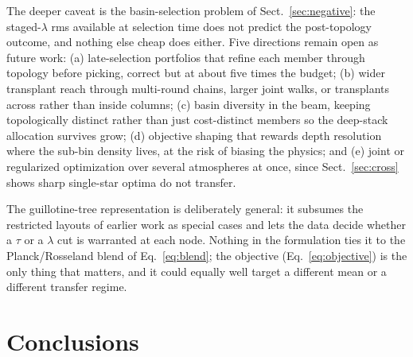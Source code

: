 \documentclass{aa}
\begin{document}
   The deeper caveat is the basin-selection problem of
   Sect.~\ref{sec:negative}: the staged-$\lambda$ rms available at
   selection time does not predict the post-topology outcome, and nothing
   else cheap does either. Five directions remain open as future work:
   (a) late-selection portfolios that refine each member through topology
   before picking, correct but at about five times the budget; (b) wider
   transplant reach through multi-round chains, larger joint walks, or
   transplants across rather than inside columns; (c) basin diversity in
   the beam, keeping topologically distinct rather than just
   cost-distinct members so the deep-stack allocation survives grow;
   (d) objective shaping that rewards depth resolution where the sub-bin
   density lives, at the risk of biasing the physics; and (e) joint or
   regularized optimization over several atmospheres at once, since
   Sect.~\ref{sec:cross} shows sharp single-star optima do not transfer.

   The guillotine-tree representation is deliberately general: it
   subsumes the restricted layouts of earlier work as special cases and
   lets the data decide whether a $\tau$ or a $\lambda$ cut is warranted
   at each node. Nothing in the formulation ties it to the
   Planck/Rosseland blend of Eq.~\ref{eq:blend}; the objective
   (Eq.~\ref{eq:objective}) is the only thing that matters, and it could
   equally well target a different mean or a different transfer regime.

\section{Conclusions}
\label{sec:conclusions}
\end{document}
